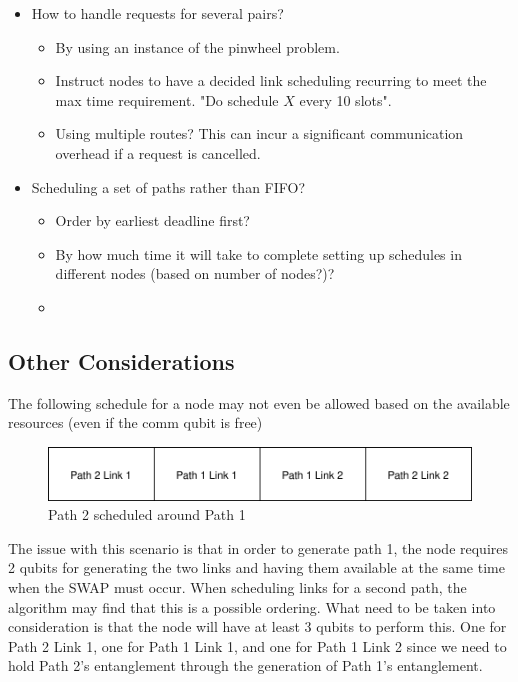 \documentclass{article}
\begin{document}
\begin{itemize}
\begin{itemize}
    \end{itemize}
    \item How to handle requests for several pairs?
    \begin{itemize}
        \item By using an instance of the pinwheel problem.
        \item Instruct nodes to have a decided link scheduling recurring to meet the max time requirement.  "Do schedule $X$ every 10 slots".
        \item Using multiple routes?  This can incur a significant communication overhead if a request is cancelled.
    \end{itemize}
    \item Scheduling a set of paths rather than FIFO?
    \begin{itemize}
        \item Order by earliest deadline first?
        \item By how much time it will take to complete setting up schedules in different nodes (based on number of nodes?)?
        \item
    \end{itemize}
\end{itemize}

\subsection{Other Considerations}
The following schedule for a node may not even be allowed based on the available resources (even if the comm qubit is free)

\begin{figure}[!htb]
    \centering
    \includegraphics[width=\textwidth]{figures/segmented_links.svg}
    \caption{Path 2 scheduled around Path 1}
    \label{fig:segmented_links}
\end{figure}

The issue with this scenario is that in order to generate path 1, the node requires 2 qubits for generating the two links and having them available at the same time when the SWAP must occur.  When scheduling links for a second path, the algorithm may find that this is a possible ordering.  What need to be taken into consideration is that the node will have at least 3 qubits to perform this.  One for Path 2 Link 1, one for Path 1 Link 1, and one for Path 1 Link 2 since we need to hold Path 2's entanglement through the generation of Path 1's entanglement.
\end{document}
